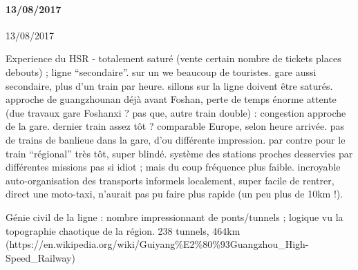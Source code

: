\paragraph{13/08/2017}{13/08/2017}

Experience du HSR - totalement saturé (vente certain nombre de tickets places debouts) ; ligne ``secondaire''. sur un we beaucoup de touristes. gare aussi secondaire, plus d'un train par heure. sillons sur la ligne doivent être saturés. approche de guangzhounan déjà avant Foshan, perte de temps énorme attente (due travaux gare Foshanxi ? pas que, autre train double) : congestion approche de la gare. dernier train assez tôt ? comparable Europe, selon heure arrivée. pas de trains de banlieue dans la gare, d'ou différente impression. par contre pour le train ``régional'' très tôt, super blindé. système des stations proches desservies par différentes missions pas si idiot ; mais du coup fréquence plus faible. incroyable auto-organisation des transports informels localement, super facile de rentrer, direct une moto-taxi, n'aurait pas pu faire plus rapide (un peu plus de 10km !).

Génie civil de la ligne : nombre impressionnant de ponts/tunnels ; logique vu la topographie chaotique de la région. 238 tunnels, 464km (https://en.wikipedia.org/wiki/Guiyang{\%}E2{\%}80{\%}93Guangzhou{\_}High-Speed{\_}Railway)















